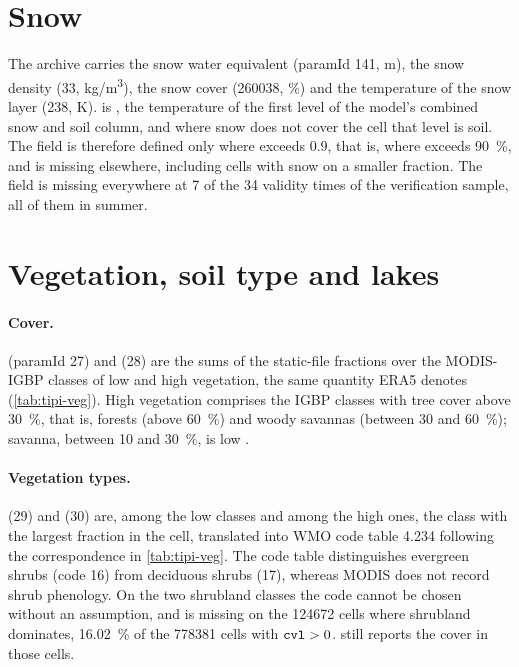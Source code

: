 \section{Snow}
\label{sec:neve}

The archive carries the snow water equivalent  (paramId 141, \si{m}), the snow density
 (33, \si{kg/m^3}), the snow cover  (260038, \si{\percent}) and the
temperature of the snow layer  (238, \si{K}).  is , the
temperature of the first level of the model's combined snow and soil column, and where snow does
not cover the cell that level is soil. The field is therefore defined only where 
exceeds \num{0.9}, that is, where  exceeds \SI{90}{\percent}, and is missing elsewhere,
including cells with snow on a smaller fraction. The field is missing everywhere at 7 of the 34
validity times of the verification sample, all of them in summer.

\section{Vegetation, soil type and lakes}
\label{sec:vegetazione}

\paragraph{Cover.}  (paramId 27) and  (28) are the sums of the static-file
fractions over the MODIS-IGBP classes of low and high vegetation, the same quantity ERA5 denotes
(\cref{tab:tipi-veg}). High vegetation comprises the IGBP classes with tree cover above
\SI{30}{\percent}, that is, forests (above \SI{60}{\percent}) and woody savannas (between 30 and
\SI{60}{\percent}); savanna, between 10 and \SI{30}{\percent}, is low \parencite{modis2022}.

\paragraph{Vegetation types.}  (29) and  (30) are, among the low classes and
among the high ones, the class with the largest fraction in the cell, translated into WMO code table
4.234 following the correspondence in \cref{tab:tipi-veg}. The code table distinguishes evergreen shrubs
(code 16) from deciduous shrubs (17), whereas MODIS does not record shrub phenology. On the two
shrubland classes the code cannot be chosen without an assumption, and  is missing on
the \num{124672} cells where shrubland dominates, \SI{16.02}{\percent} of the \num{778381} cells
with $\campo{cvl} > 0$.  still reports the cover in those cells.

